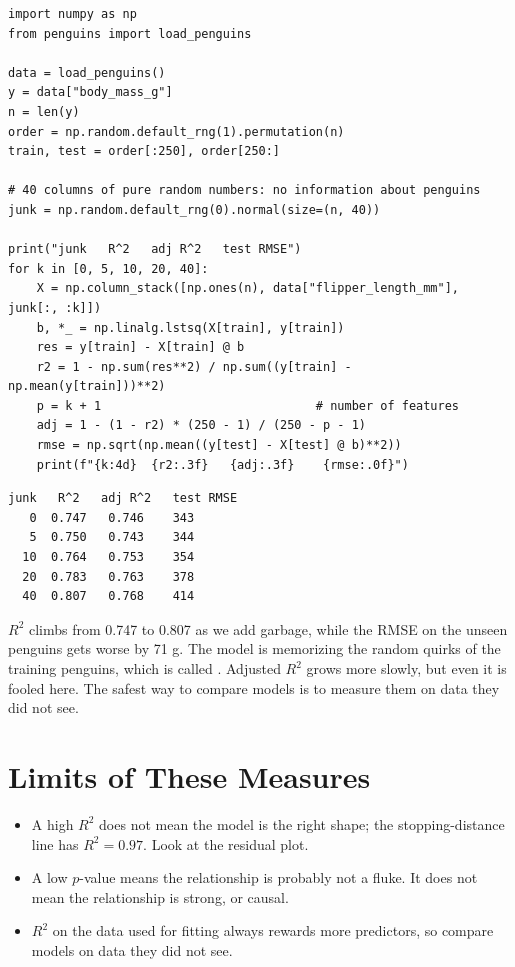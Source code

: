 \begin{verbatim}
import numpy as np
from penguins import load_penguins

data = load_penguins()
y = data["body_mass_g"]
n = len(y)
order = np.random.default_rng(1).permutation(n)
train, test = order[:250], order[250:]

# 40 columns of pure random numbers: no information about penguins
junk = np.random.default_rng(0).normal(size=(n, 40))

print("junk   R^2   adj R^2   test RMSE")
for k in [0, 5, 10, 20, 40]:
    X = np.column_stack([np.ones(n), data["flipper_length_mm"], junk[:, :k]])
    b, *_ = np.linalg.lstsq(X[train], y[train])
    res = y[train] - X[train] @ b
    r2 = 1 - np.sum(res**2) / np.sum((y[train] - np.mean(y[train]))**2)
    p = k + 1                              # number of features
    adj = 1 - (1 - r2) * (250 - 1) / (250 - p - 1)
    rmse = np.sqrt(np.mean((y[test] - X[test] @ b)**2))
    print(f"{k:4d}  {r2:.3f}   {adj:.3f}    {rmse:.0f}")
\end{verbatim}

\begin{verbatim}
junk   R^2   adj R^2   test RMSE
   0  0.747   0.746    343
   5  0.750   0.743    344
  10  0.764   0.753    354
  20  0.783   0.763    378
  40  0.807   0.768    414
\end{verbatim}

$R^2$ climbs from 0.747 to 0.807 as we add garbage, while the RMSE on the unseen penguins gets worse by 71 g. The
model is memorizing the random quirks of the training penguins, which is called .
Adjusted $R^2$ grows more slowly, but even it is fooled here. The safest way to compare models is to measure them
on data they did not see.

\section{Limits of These Measures}
\begin{itemize}
\item A high $R^2$ does not mean the model is the right shape; the stopping-distance line has
$R^2 = 0.97$. Look at the residual plot.
\item A low $p$-value means the relationship is probably not a fluke. It does not mean the relationship is
strong, or causal.
\item $R^2$ on the data used for fitting always rewards more predictors, so compare models on data they did
not see.
\end{itemize}

